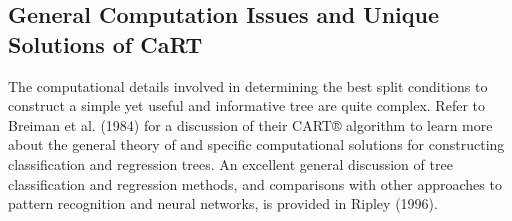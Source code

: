 \documentclass[caret-main.tex]{subfiles}
\begin{document}
\subsection{General Computation Issues and Unique Solutions of CaRT}

The computational details involved in determining the best split conditions to construct a simple yet useful and informative tree are quite complex. Refer to Breiman et al. (1984) for a discussion of their CART® algorithm to learn more about the general theory of and specific computational solutions for constructing classification and regression trees. An excellent general discussion of tree classification and regression methods, and comparisons with other approaches to pattern recognition and neural networks, is provided in Ripley (1996).

\end{document}
